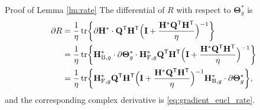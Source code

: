 \documentclass[journal]{IEEEtran}
\begin{document}
\begin{appendix}
	\begin{subsection}{Proof of Lemma \ref{lm:rate}}
		\label{ap:rate}
		The differential of $R$ with respect to $\mathbf{\Theta}_g^*$ is \cite{Hjorungnes2007}
		\begin{align*}
			\partial R
			& = \frac{1}{\eta} \operatorname{tr} \biggl\{ \partial \mathbf{H}^* \cdot \mathbf{Q}^\mathsf{T} \mathbf{H}^\mathsf{T} \Bigl(\mathbf{I} + \frac{\mathbf{H}^* \mathbf{Q}^\mathsf{T} \mathbf{H}^\mathsf{T}}{\eta}\Bigr)^{-1} \biggr\}                                                                      \\
			& = \frac{1}{\eta} \operatorname{tr} \biggl\{ \mathbf{H}_{\mathrm{B},g}^* \cdot \partial \mathbf{\Theta}_g^* \cdot \mathbf{H}_{\mathrm{F},g}^* \mathbf{Q}^\mathsf{T} \mathbf{H}^\mathsf{T} \Bigl(\mathbf{I} + \frac{\mathbf{H}^* \mathbf{Q}^\mathsf{T} \mathbf{H}^\mathsf{T}}{\eta}\Bigr)^{-1} \biggr\} \\
			& = \frac{1}{\eta} \operatorname{tr} \biggl\{ \mathbf{H}_{\mathrm{F},g}^* \mathbf{Q}^\mathsf{T} \mathbf{H}^\mathsf{T} \Bigl(\mathbf{I} + \frac{\mathbf{H}^* \mathbf{Q}^\mathsf{T} \mathbf{H}^\mathsf{T}}{\eta}\Bigr)^{-1} \mathbf{H}_{\mathrm{B},g}^* \cdot \partial \mathbf{\Theta}_g^* \biggr\},
		\end{align*}
		and the corresponding complex derivative is \eqref{eq:gradient_eucl_rate}.
	\end{subsection}


\end{appendix}
\end{document}
